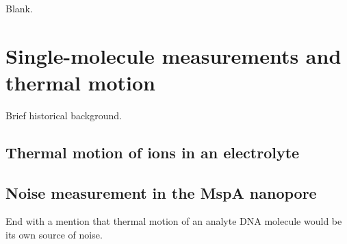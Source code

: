 \begin{savequote}[75mm]
Blank.
\end{savequote}

\chapter{Single-molecule measurements and thermal motion}
\label{introduction}

Brief historical background.

\section{Thermal motion of ions in an electrolyte}

\section{Noise measurement in the MspA nanopore}

End with a mention that thermal motion of an analyte DNA molecule would be its own source of noise.